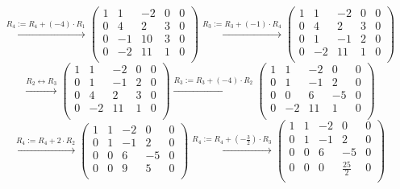\documentclass[a4paper]{article}
\begin{document}
\[
\xrightarrow{\text{$R_4:= R_4 + (-4) \cdot R_1$}}
\left(
\begin{array}{cccc|c}
1 & 1 & -2 & 0 & 0 \\
0 & 4 & 2 & 3 & 0 \\
0 & -1 & 10 & 3 & 0 \\
0 & -2 & 11 & 1 & 0 \\
\end{array}
\right)
\xrightarrow{\text{$R_3:= R_3 + (-1) \cdot R_4$}}
\left(
\begin{array}{cccc|c}
1 & 1 & -2 & 0 & 0 \\
0 & 4 & 2 & 3 & 0 \\
0 & 1 & -1 & 2 & 0 \\
0 & -2 & 11 & 1 & 0 \\
\end{array}
\right)
\]
\[
\xrightarrow{\text{$R_2 \leftrightarrow R_3$}}
\left(
\begin{array}{cccc|c}
1 & 1 & -2 & 0 & 0 \\
0 & 1 & -1 & 2 & 0 \\
0 & 4 & 2 & 3 & 0 \\
0 & -2 & 11 & 1 & 0 \\
\end{array}
\right)
\xrightarrow{\text{$R_3:= R_3 + (-4) \cdot R_2$}}
\left(
\begin{array}{cccc|c}
1 & 1 & -2 & 0 & 0 \\
0 & 1 & -1 & 2 & 0 \\
0 & 0 & 6 & -5 & 0 \\
0 & -2 & 11 & 1 & 0 \\
\end{array}
\right)
\]
\[
\xrightarrow{\text{$R_4:= R_4 + 2 \cdot R_2$}}
\left(
\begin{array}{cccc|c}
1 & 1 & -2 & 0 & 0 \\
0 & 1 & -1 & 2 & 0 \\
0 & 0 & 6 & -5 & 0 \\
0 & 0 & 9 & 5 & 0 \\
\end{array}
\right)
\xrightarrow{\text{$R_4:= R_4 + (- \frac{3}{2}) \cdot R_3$}}
\left(
\begin{array}{cccc|c}
1 & 1 & -2 & 0 & 0 \\
0 & 1 & -1 & 2 & 0 \\
0 & 0 & 6 & -5 & 0 \\
0 & 0 & 0 & \frac{25}{2} & 0 \\
\end{array}
\right)
\]
\end{document}
